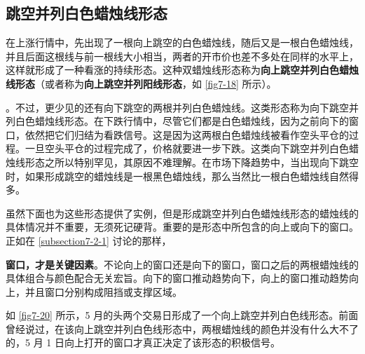 \subsection{跳空并列白色蜡烛线形态}
在上涨行情中，先出现了一根向上跳空的白色蜡烛线，随后又是一根白色蜡烛线，并且后面这根线与前一根线大小相当，两者的开市价也差不多处在同样的水平上，这样就形成了一种看涨的持续形态。这种双蜡烛线形态称为\textbf{向上跳空并列白色蜡烛线形态}（或者称为\textbf{向上跳空并列阳线形态}，如 \autoref{fig7-18} 所示）。

。不过，更少见的还有向下跳空的两根并列白色蜡烛线。这类形态称为向下跳空并列白色蜡烛线形态。在下跌行情中，尽管它们都是白色蜡烛线，因为之前向下的窗口，依然把它们归结为看跌信号。这是因为这两根白色蜡烛线被看作空头平仓的过程。一旦空头平仓的过程完成了，价格就要进一步下跌。这类向下跳空并列白色蜡烛线形态之所以特别罕见，其原因不难理解。在市场下降趋势中，当出现向下跳空时，如果形成跳空的蜡烛线是一根黑色蜡烛线，那么当然比一根白色蜡烛线自然得多。


虽然下面也为这些形态提供了实例，但是形成跳空并列白色蜡烛线形态的蜡烛线的具体情况并不重要，无须死记硬背。重要的是形态中所包含的向上或向下的窗口。正如在 \autoref{subsection7-2-1}  讨论的那样，

\textbf{窗口，才是关键因素}。不论向上的窗口还是向下的窗口，窗口之后的两根蜡烛线的具体组合与颜色配合无关宏旨。向下的窗口推动趋势向下，向上的窗口推动趋势向上，并且窗口分别构成阻挡或支撑区域。

如 \autoref{fig7-20} 所示，5 月的头两个交易日形成了一个向上跳空并列白色线形态。前面曾经说过，在该向上跳空并列白色线形态中，两根蜡烛线的颜色并没有什么大不了的，5 月 1 日向上打开的窗口才真正决定了该形态的积极信号。

